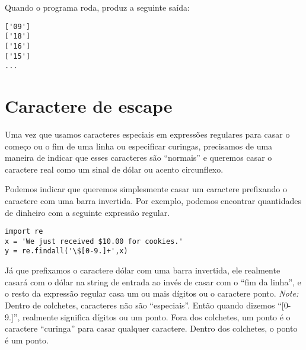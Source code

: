 Quando o programa roda, produz a seguinte saída:

\beforeverb
\begin{verbatim}
['09']
['18']
['16']
['15']
...
\end{verbatim}
\afterverb
%

\section{Caractere de escape}

Uma vez que usamos caracteres especiais em expressões regulares para casar o
começo ou o fim de uma linha ou especificar curingas, precisamos de uma
maneira de indicar que esses caracteres são ``normais'' e queremos casar o
caractere real como um sinal de dólar ou acento circunflexo.

Podemos indicar que queremos simplesmente casar um caractere prefixando o
caractere com uma barra invertida. Por exemplo, podemos encontrar quantidades
de dinheiro com a seguinte expressão regular.

\beforeverb
\begin{verbatim}
import re
x = 'We just received $10.00 for cookies.'
y = re.findall('\$[0-9.]+',x)
\end{verbatim}
\afterverb
%

Já que prefixamos o caractere dólar com uma barra invertida, ele realmente
casará com o dólar na string de entrada ao invés de casar com o ``fim da
linha'', e o resto da expressão regular casa um ou mais dígitos ou o
caractere ponto. {\em Note:} Dentro de colchetes, caracteres não são
``especiais''. Então quando dizemos ``[0-9.]'', realmente significa dígitos
ou um ponto. Fora dos colchetes, um ponto é o caractere ``curinga'' para
casar qualquer caractere. Dentro dos colchetes, o ponto é um ponto.

